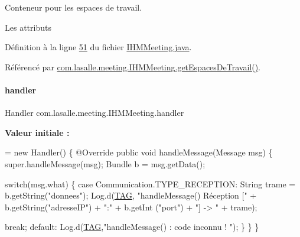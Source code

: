 Conteneur pour les espaces de travail. 

Les attributs 

Définition à la ligne \hyperlink{_i_h_m_meeting_8java_source_l00051}{51} du fichier \hyperlink{_i_h_m_meeting_8java_source}{I\+H\+M\+Meeting.\+java}.



Référencé par \hyperlink{_i_h_m_meeting_8java_source_l00163}{com.\+lasalle.\+meeting.\+I\+H\+M\+Meeting.\+get\+Espaces\+De\+Travail()}.

\mbox{\label{classcom_1_1lasalle_1_1meeting_1_1_i_h_m_meeting_af0a341dd3f520bba9d94b4b083ff75af}} 
\paragraph{\texorpdfstring{handler}{handler}}
{\footnotesize\ttfamily Handler com.\+lasalle.\+meeting.\+I\+H\+M\+Meeting.\+handler\hspace{0.3cm}{\ttfamily [private]}}

{\bfseries Valeur initiale \+:}
\begin{DoxyCode}
= \textcolor{keyword}{new} Handler()
    \{
        @Override
        \textcolor{keyword}{public} \textcolor{keywordtype}{void} handleMessage(Message msg)
        \{
            super.handleMessage(msg);
            Bundle b = msg.getData();

            \textcolor{keywordflow}{switch}(msg.what)
            \{
                \textcolor{keywordflow}{case} Communication.TYPE\_RECEPTION:
                    String trame = b.getString(\textcolor{stringliteral}{"donnees"});
                    Log.d(\hyperlink{classcom_1_1lasalle_1_1meeting_1_1_i_h_m_meeting_a239eafcb0ccc896bdba538d1c0f08e65}{TAG}, \textcolor{stringliteral}{"handleMessage() Réception ["} + b.getString(\textcolor{stringliteral}{"adresseIP"}) + \textcolor{stringliteral}{":"} + b.getInt
      (\textcolor{stringliteral}{"port"}) + \textcolor{stringliteral}{"] -> "} + trame);

                    

                    \textcolor{keywordflow}{break};
                \textcolor{keywordflow}{default}:
                    Log.d(\hyperlink{classcom_1_1lasalle_1_1meeting_1_1_i_h_m_meeting_a239eafcb0ccc896bdba538d1c0f08e65}{TAG},\textcolor{stringliteral}{"handleMessage() : code inconnu ! "});
            \}
        \}
    \}
\end{DoxyCode}


